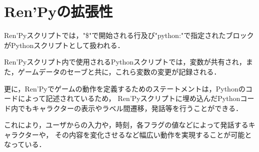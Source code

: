 \section{Ren'Pyの拡張性}

  Ren'Pyスクリプトでは，"\$"で開始される行及び"python:"で指定されたブロックがPythonスクリプトとして扱われる．

  Ren'Pyスクリプト内で使用されるPythonスクリプトでは，変数が共有され，また，ゲームデータのセーブと共に，これら変数の変更が記録される．

  更に，Ren'Pyでゲームの動作を定義するためのステートメントは，Pythonのコードによって記述されているため，
  Ren'Pyスクリプトに埋め込んだPythonコード内でもキャラクターの表示やラベル間遷移，発話等を行うことができる．

  これにより，ユーザからの入力や，時刻，各フラグの値などによって発話するキャラクターや，
  その内容を変化させるなど幅広い動作を実現することが可能となっている．
  